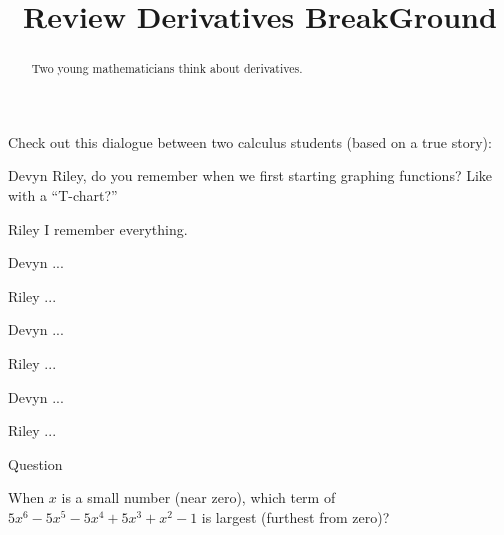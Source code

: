 \documentclass{ximera}
\title[Break-Ground:]{Review Derivatives BreakGround}
\begin{document}
\begin{abstract}
  Two young mathematicians think about derivatives.
\end{abstract}
\maketitle

Check out this dialogue between two calculus students (based on a true
story):

\begin{dialogue}
\item[Devyn] Riley, do you remember when we first starting graphing
  functions? Like with a ``T-chart?''
\item[Riley] I remember everything.
\item[Devyn] ...
\item[Riley] ...
\item[Devyn] ...
\item[Riley] ...
\item[Devyn] ...
\item[Riley] ...
\end{dialogue}

\begin{problem}
 Question
  \begin{multipleChoice}
  \end{multipleChoice}
\end{problem}

\begin{problem}
  When $x$ is a small number (near zero), which term of
  $5x^6-5x^5-5x^4+5x^3+x^2 -1$ is largest (furthest from zero)?
  \begin{multipleChoice}
  \end{multipleChoice}
\end{problem}




\end{document}
